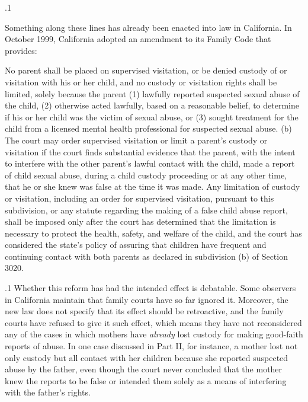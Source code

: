 \documentclass[11pt, twoside]{article}
\begin{document}
{\p.1{%
Something along these lines has already been enacted into law in California. In October 1999, California adopted an amendment to its Family
Code that provides:

\begin{blockQuote}
No parent shall be placed on supervised visitation, or be denied
custody of or visitation with his or her child, and no custody or
visitation rights shall be limited, solely because the parent (1) lawfully reported suspected sexual abuse of the child, (2) otherwise
acted lawfully, based on a reasonable belief, to determine if his or
her child was the victim of sexual abuse, or (3) sought treatment
for the child from a licensed mental health professional for suspected sexual abuse. (b) The court may order supervised visitation
or limit a parent’s custody or visitation if the court finds substantial
evidence that the parent, with the intent to interfere with the other
parent’s lawful contact with the child, made a report of child sexual abuse, during a child custody proceeding or at any other time,
that he or she knew was false at the time it was made. Any limitation of custody or visitation, including an order for supervised
visitation, pursuant to this subdivision, or any statute regarding the
making of a false child abuse report, shall be imposed only after the
court has determined that the limitation is necessary to protect the
health, safety, and welfare of the child, and the court has considered the state’s policy of assuring that children have frequent and
continuing contact with both parents as declared in subdivision
(b) of Section 3020.
\end{blockQuote}

}%

\p.1{%
Whether this reform has had the intended effect is debatable. Some
observers in California maintain that family courts have so far ignored it.
Moreover, the new law does not specify that its effect should be retroactive, and the family courts have refused to give it such effect, which
means they have not reconsidered any of the cases in which mothers
have \textit{already} lost custody for making good-faith reports of abuse. In one
case discussed in Part II, for instance, a mother lost not
only custody but all contact with her children because she reported suspected abuse by the father, even though the court never concluded that
the mother knew the reports to be false or intended them solely as a
means of interfering with the father’s rights.
}%

}
\end{document}
